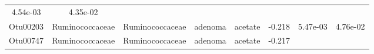 \documentclass[11pt,]{article}
\begin{document}
\begin{longtable}[]{@{}cccccccc@{}}
\begin{minipage}[t]{0.08\columnwidth}
4.54e-03\strut
\end{minipage} & \begin{minipage}[t]{0.08\columnwidth}\centering\strut
4.35e-02\strut
\end{minipage}\tabularnewline
\begin{minipage}[t]{0.08\columnwidth}\centering\strut
Otu00203\strut
\end{minipage} & \begin{minipage}[t]{0.15\columnwidth}\centering\strut
Ruminococcaceae\strut
\end{minipage} & \begin{minipage}[t]{0.15\columnwidth}\centering\strut
Ruminococcaceae\strut
\end{minipage} & \begin{minipage}[t]{0.08\columnwidth}\centering\strut
adenoma\strut
\end{minipage} & \begin{minipage}[t]{0.09\columnwidth}\centering\strut
acetate\strut
\end{minipage} & \begin{minipage}[t]{0.07\columnwidth}\centering\strut
-0.218\strut
\end{minipage} & \begin{minipage}[t]{0.08\columnwidth}\centering\strut
5.47e-03\strut
\end{minipage} & \begin{minipage}[t]{0.08\columnwidth}\centering\strut
4.76e-02\strut
\end{minipage}\tabularnewline
\begin{minipage}[t]{0.08\columnwidth}\centering\strut
Otu00747\strut
\end{minipage} & \begin{minipage}[t]{0.15\columnwidth}\centering\strut
Ruminococcaceae\strut
\end{minipage} & \begin{minipage}[t]{0.15\columnwidth}\centering\strut
Ruminococcaceae\strut
\end{minipage} & \begin{minipage}[t]{0.08\columnwidth}\centering\strut
adenoma\strut
\end{minipage} & \begin{minipage}[t]{0.09\columnwidth}\centering\strut
acetate\strut
\end{minipage} & \begin{minipage}[t]{0.07\columnwidth}\centering\strut
-0.217\strut
\end{minipage} & \begin{minipage}[t]{0.08\columnwidth}\centering\strut

\end{minipage}
\end{longtable}
\end{document}
